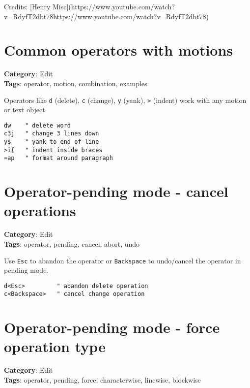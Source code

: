 {{{{Credits: [Henry Misc](https://www.youtube.com/watch?v=RdyfT2dbt78https://www.youtube.com/watch?v=RdyfT2dbt78)

\section{Common operators with motions}

\textbf{Category}: Edit\\ \textbf{Tags}: operator, motion, combination, examples
\vspace{0.5cm}

Operators like {\footnotesize \Verb§d§} (delete), {\footnotesize \Verb§c§} (change), {\footnotesize \Verb§y§} (yank), {\footnotesize \Verb§>§} (indent) work with any motion or text object.

\begin{Exa*}{}
\begin{Verbatim}[fontsize=\footnotesize, breaklines, breakanywhere]
dw    " delete word
c3j   " change 3 lines down
y$    " yank to end of line
>i{   " indent inside braces
=ap   " format around paragraph
\end{Verbatim}
\end{Exa*}

\section{Operator-pending mode - cancel operations}

\textbf{Category}: Edit\\ \textbf{Tags}: operator, pending, cancel, abort, undo
\vspace{0.5cm}

Use {\footnotesize \Verb§Esc§} to abandon the operator or {\footnotesize \Verb§Backspace§} to undo/cancel the operator in pending mode.

\begin{Exa*}{}
\begin{Verbatim}[fontsize=\footnotesize, breaklines, breakanywhere]
d<Esc>         " abandon delete operation
c<Backspace>   " cancel change operation
\end{Verbatim}
\end{Exa*}

\section{Operator-pending mode - force operation type}

\textbf{Category}: Edit\\ \textbf{Tags}: operator, pending, force, characterwise, linewise, blockwise
\vspace{0.5cm}

}}}}
